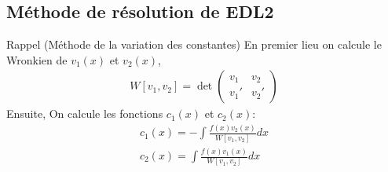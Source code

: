 \subsection{Méthode de résolution de EDL2}

\begin{parag}{Rappel (Méthode de la variation des constantes)}
    En premier lieu on calcule le Wronkien de $v_1(x)$ et $v_2(x)$, 
    \begin{align*}
        W[v_1, v_2] = \det \begin{pmatrix}
            v_1  & v_2 \\
            v_1' & v_2'
        \end{pmatrix}
    \end{align*}
    Ensuite, On calcule les fonctions $c_1(x)$ et $c_2(x)$:
    \begin{align*}
        c_1(x) = -\int \frac{f(x)v_2(x)}{W[v_1, v_2]}dx \\
        c_2(x) = \int \frac{f(x)v_1(x)}{W[v_1, v_2]}dx
    \end{align*}

    
    

\end{parag}

